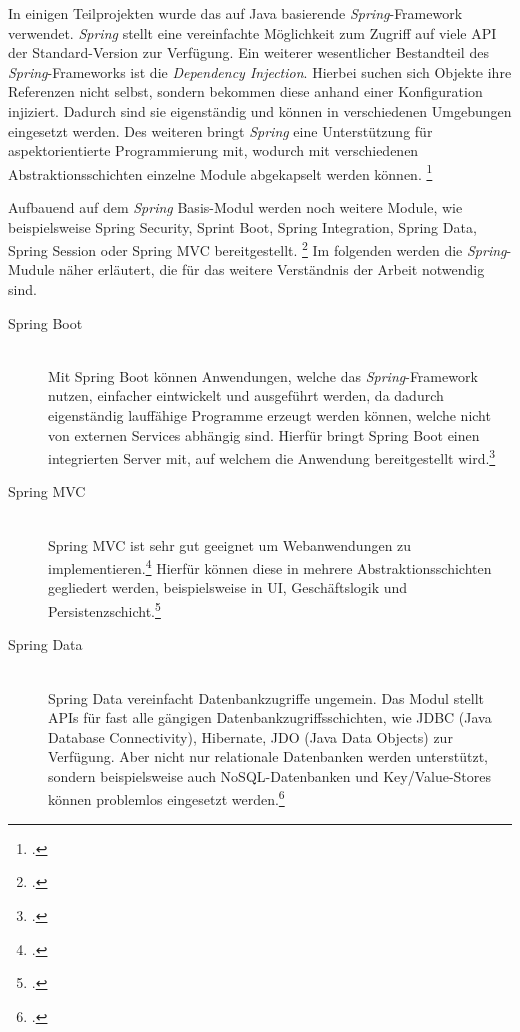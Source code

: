 In einigen Teilprojekten wurde das auf Java basierende \textit{Spring}-Framework verwendet.
\textit{Spring} stellt eine vereinfachte Möglichkeit zum Zugriff auf viele \ac{API} der
Standard-Version zur Verfügung. Ein weiterer wesentlicher Bestandteil des
\textit{Spring}-Frameworks ist die \textit{Dependency Injection}. Hierbei suchen sich Objekte ihre
Referenzen nicht selbst, sondern bekommen diese anhand einer Konfiguration injiziert. Dadurch sind
sie eigenständig und können in verschiedenen Umgebungen eingesetzt werden. Des weiteren bringt
\textit{Spring} eine Unterstützung für aspektorientierte Programmierung mit, wodurch mit
verschiedenen Abstraktionsschichten einzelne Module abgekapselt werden können. \footcite[Vgl.][2]{spring3}

Aufbauend auf dem \textit{Spring} Basis-Modul werden noch weitere Module, wie beispielsweise Spring
Security, Sprint Boot, Spring Integration, Spring Data, Spring Session oder Spring MVC
bereitgestellt.
\footcite[Vgl.][2]{springPivotal} Im folgenden werden die \textit{Spring}-Mudule näher erläutert,
die für das weitere Verständnis der Arbeit notwendig sind.

\begin{description}
  \item[Spring Boot] \hfill \\
    Mit Spring Boot können Anwendungen, welche das \textit{Spring}-Framework nutzen, einfacher
    eintwickelt und ausgeführt werden, da dadurch eigenständig lauffähige Programme erzeugt werden können, welche nicht von externen Services abhängig sind. Hierfür bringt Spring Boot einen integrierten Server mit, auf welchem die Anwendung bereitgestellt wird.\footcite[Vgl.][1]{springBoot}
  \item[Spring MVC] \hfill \\
    Spring MVC ist sehr gut geeignet um Webanwendungen zu implementieren.\footcite[Vgl.][3]{spring3}
    Hierfür können diese in mehrere Abstraktionsschichten gegliedert werden, beispielsweise in
    \ac{UI}, Geschäftslogik und Persistenzschicht.\footcite[Vgl.][21]{springMvc}
  \item[Spring Data] \hfill \\
    Spring Data vereinfacht Datenbankzugriffe ungemein. Das Modul stellt \acp{API} für fast alle
    gängigen Datenbankzugriffsschichten, wie JDBC (Java Database Connectivity), Hibernate, JDO
    (Java Data Objects) zur Verfügung. Aber nicht nur relationale Datenbanken werden unterstützt,
    sondern beispielsweise auch NoSQL-Datenbanken und Key/Value-Stores können problemlos eingesetzt
    werden.\footcite[Vgl.][3f]{springData}
\end{description}

